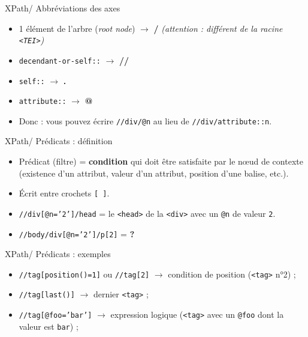 \documentclass{beamer}
\begin{document}
    \begin{frame}{XPath/ Abbréviations des axes}
    \Large
        \begin{itemize}
            \item 1 élément de l'arbre (\textit{root node}) $\rightarrow$ \textbf{/} \textit{(attention : différent de la racine \texttt{<TEI>})}
            \item \texttt{decendant-or-self::} $\rightarrow$ \textbf{//}
            \item \texttt{self::} $\rightarrow$ \textbf{.}
            \item \texttt{attribute::} $\rightarrow$ \textbf{@}
            \bigskip
            \item Donc : vous pouvez écrire \texttt{//div/@n} au lieu de \texttt{//div/attribute::n}.
        \end{itemize}
    \end{frame}
    
    \begin{frame}{XPath/ Prédicats : définition}
        \Large
        \begin{itemize}
            \item Prédicat (filtre) = \textbf{condition} qui doit être satisfaite par le n\oe ud de contexte (existence d'un attribut, valeur d'un attribut, position d'une balise, etc.).
            \item Écrit entre crochets \texttt{[ ]}.
            \bigskip
            \item \texttt{//div[@n='2']/head} = le \texttt{<head>} de la \texttt{<div>} avec un \texttt{@n} de valeur \texttt{2}.
            \bigskip
            \item \texttt{//body/div[@n='2']/p[2]} = \textbf{?}
        \end{itemize}
    \end{frame}

    \begin{frame}{XPath/ Prédicats : exemples}
        \Large
        \begin{itemize}
            \item \texttt{//tag[position()=1]} ou \texttt{//tag[2]} $\rightarrow$ condition de position (\texttt{<tag>} n°2) ;
            \bigskip
            \item \texttt{//tag[last()]} $\rightarrow$ dernier \texttt{<tag>} ;
            \bigskip
            \item \texttt{//tag[@foo='bar']} $\rightarrow$ expression logique (\texttt{<tag>} avec un \texttt{@foo} dont la valeur est \texttt{bar}) ;
        \end{itemize}
    \end{frame}
\end{document}
